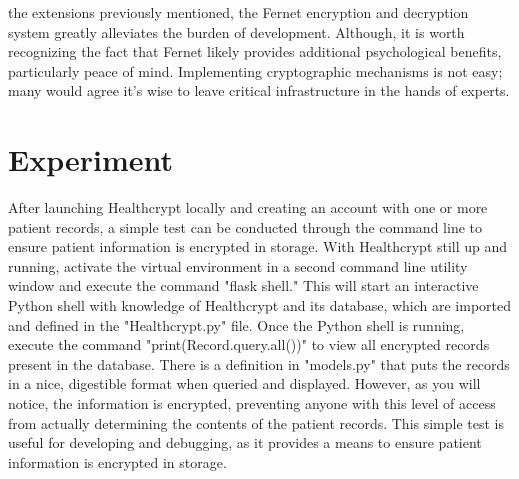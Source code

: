 \documentclass[letterpaper, 10pt,DIV=13]{scrartcl}
\begin{document}
\begin{multicols}{2}
\begin{spacing}{1.25}
the extensions previously mentioned, the Fernet encryption and decryption system greatly alleviates the burden of development. Although, it is worth recognizing the fact that Fernet likely provides additional psychological benefits, particularly peace of mind. Implementing cryptographic mechanisms is not easy; many would agree it's wise to leave critical infrastructure in the hands of experts.
\end{spacing}

\vspace{-2.5pt}

\section*{Experiment}
\begin{spacing}{1.25}
After launching Healthcrypt locally and creating an account with one or more patient records, a simple test can be conducted through the command line to ensure patient information is encrypted in storage. With Healthcrypt still up and running, activate the virtual environment in a second command line utility window and execute the command "flask shell." This will start an interactive Python shell with knowledge of Healthcrypt and its database, which are imported and defined in the "Healthcrypt.py" file. Once the Python shell is running, execute the command "print(Record.query.all())" to view all encrypted records present in the database. There is a definition in "models.py" that puts the records in a nice, digestible format when queried and displayed. However, as you will notice, the information is encrypted, preventing anyone with this level of access from actually determining the contents of the patient records. This simple test is useful for developing and debugging, as it provides a means to ensure patient information is encrypted in storage.
\end{spacing}

\vspace{-2.5pt}


\end{multicols}
\end{document}
